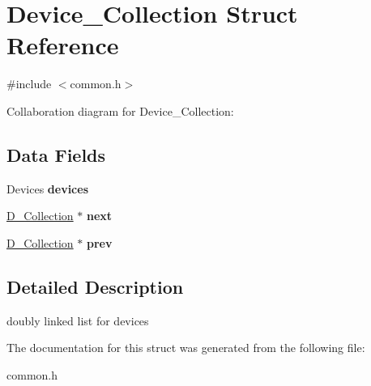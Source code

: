 \hypertarget{struct_device___collection}{}\section{Device\+\_\+\+Collection Struct Reference}
\label{struct_device___collection}


{\ttfamily \#include $<$common.\+h$>$}



Collaboration diagram for Device\+\_\+\+Collection\+:
\subsection*{Data Fields}
\begin{DoxyCompactItemize}
\item 
Devices {\bfseries devices}\hypertarget{struct_device___collection_ac451518cc6db3023ae782d6456bd29c5}{}\label{struct_device___collection_ac451518cc6db3023ae782d6456bd29c5}

\item 
\hyperlink{struct_device___collection}{D\+\_\+\+Collection} $\ast$ {\bfseries next}\hypertarget{struct_device___collection_ac816fce596139b2ee15a2cb1f9fe8a5e}{}\label{struct_device___collection_ac816fce596139b2ee15a2cb1f9fe8a5e}

\item 
\hyperlink{struct_device___collection}{D\+\_\+\+Collection} $\ast$ {\bfseries prev}\hypertarget{struct_device___collection_a300565259c9e3d05e7fc21bfdd76e41f}{}\label{struct_device___collection_a300565259c9e3d05e7fc21bfdd76e41f}

\end{DoxyCompactItemize}


\subsection{Detailed Description}
doubly linked list for devices 

The documentation for this struct was generated from the following file\+:\begin{DoxyCompactItemize}
\item 
common.\+h\end{DoxyCompactItemize}
